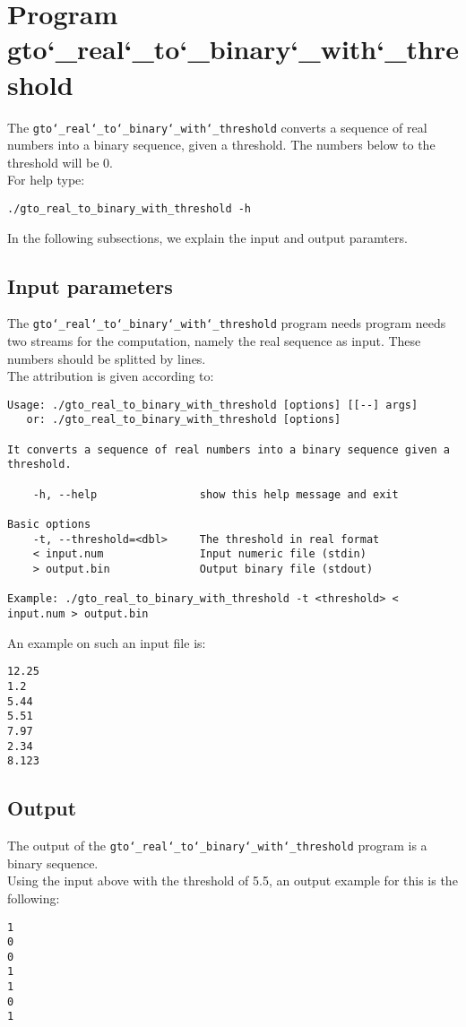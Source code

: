 \section{Program gto\char`_real\char`_to\char`_binary\char`_with\char`_threshold}
The \texttt{gto\char`_real\char`_to\char`_binary\char`_with\char`_threshold} converts a sequence of real numbers into a binary sequence, given a threshold. The numbers below to the threshold will be 0.\\
For help type:
\begin{lstlisting}
./gto_real_to_binary_with_threshold -h
\end{lstlisting}
In the following subsections, we explain the input and output paramters.

\subsection*{Input parameters}

The \texttt{gto\char`_real\char`_to\char`_binary\char`_with\char`_threshold} program needs program needs two streams for the computation, namely the real sequence as input. These numbers should be splitted by lines.\\
The attribution is given according to:
\begin{lstlisting}
Usage: ./gto_real_to_binary_with_threshold [options] [[--] args]
   or: ./gto_real_to_binary_with_threshold [options]

It converts a sequence of real numbers into a binary sequence given a threshold.

    -h, --help                show this help message and exit

Basic options
    -t, --threshold=<dbl>     The threshold in real format
    < input.num               Input numeric file (stdin)
    > output.bin              Output binary file (stdout)

Example: ./gto_real_to_binary_with_threshold -t <threshold> < input.num > output.bin
\end{lstlisting}
An example on such an input file is:
\begin{lstlisting}
12.25
1.2
5.44
5.51
7.97
2.34
8.123
\end{lstlisting}

\subsection*{Output}
The output of the \texttt{gto\char`_real\char`_to\char`_binary\char`_with\char`_threshold} program is a binary sequence.\\
Using the input above with the threshold of 5.5, an output example for this is the following:
\begin{lstlisting}
1
0
0
1
1
0
1
\end{lstlisting}